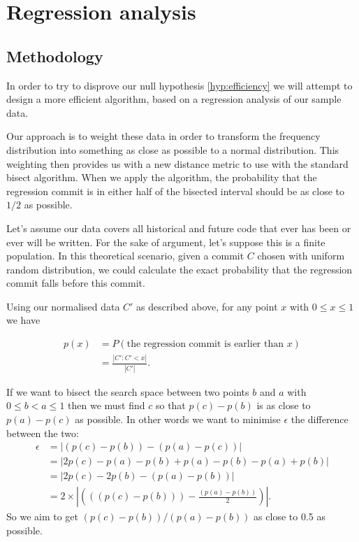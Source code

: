 \documentclass[pdflatex, sn-mathphys, referee]{sn-jnl}%
\theoremstyle{thmstyleone}%
\theoremstyle{thmstyletwo}%
\theoremstyle{thmstylethree}%
\def\setsep{:}
\newcommand{\card}[1]{\left\vert #1 \right\vert}
\theoremstyle{thmstyleone}
\begin{document}
\section{Regression analysis}
\label{section-regression}

\subsection{Methodology}

In order to try to disprove our null hypothesis \ref{hyp:efficiency} we will attempt to design a more efficient algorithm, based on a regression analysis of our sample data.

Our approach is to weight these data in order to transform the frequency distribution into something as close as possible to a normal distribution. This weighting then provides us with a new distance metric to use with the standard bisect algorithm. When we apply the algorithm, the probability that the regression commit is in either half of the bisected interval should be as close to $1/2$ as possible.

Let's assume our data covers all historical and future code that ever has been or ever will be written. For the sake of argument, let's suppose this is a finite population. In this theoretical scenario, given a commit $C$ chosen with uniform random distribution, we could calculate the exact probability that the regression commit falls before this commit.

Using our normalised data $C'$ as described above, for any point $x$ with $0 \le x \le 1$ we have

\begin{align*}
p(x) & = P( \text{the regression commit is earlier than } x) \\
    & = \frac{\card{ C' \setsep C' < x }}{ \card{ C' }} .
\end{align*}

If we want to bisect the search space between two points $b$ and $a$ with $0 \le b < a \le 1$ then we must find $c$ so that $p(c) - p(b)$ is as close to $p(a) - p(c)$ as possible. In other words we want to minimise $\epsilon$ the difference between the two:
\begin{align*}
\epsilon & = \card{(p(c) - p(b)) - (p(a) - p(c))} \\
         & = \card{2p(c) - p(a) - p(b) + p(a) - p(b) - p(a) + p(b)} \\
         & = \card{2p(c) - 2p(b) - (p(a) - p(b))} \\
         & = 2 \times \card{\left(((p(c) - p(b))) - \frac{(p(a) - p(b))}{2} \right)} .
\end{align*}
So we aim to get $(p(c) - p(b)) / (p(a) - p(b))$ as close to 0.5 as possible.
\end{document}
